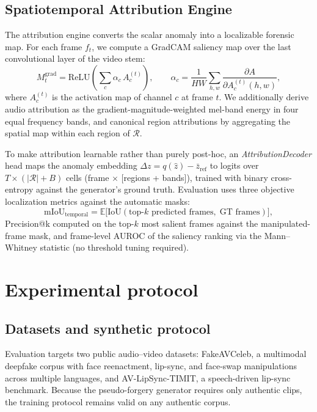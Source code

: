 \documentclass[sn-basic,Numbered,referee]{sn-jnl}
\begin{document}
\subsection{Spatiotemporal Attribution Engine}
\label{sec:sae}

The attribution engine converts the scalar anomaly into a localizable forensic map. For each frame $f_t$, we compute a GradCAM saliency map over the last convolutional layer of the video stem:
\begin{equation}
M_t^\text{grad} = \text{ReLU}\!\left(\sum_{c} \alpha_c\, A_c^{(t)}\right), \qquad
\alpha_c = \frac{1}{HW}\sum_{h,w}\frac{\partial A}{\partial A_c^{(t)}(h,w)},
\end{equation}
where $A_c^{(t)}$ is the activation map of channel $c$ at frame $t$. We additionally derive audio attribution as the gradient-magnitude-weighted mel-band energy in four equal frequency bands, and canonical region attributions by aggregating the spatial map within each region of $\mathcal{R}$.

To make attribution learnable rather than purely post-hoc, an \emph{AttributionDecoder} head maps the anomaly embedding $\Delta z = q(\hat{z}) - \bar{z}_\text{ref}$ to logits over $T \times (|\mathcal{R}| + B)$ cells (frame $\times$ [regions + bands]), trained with binary cross-entropy against the generator's ground truth. Evaluation uses three objective localization metrics against the automatic masks:
\begin{equation}
\text{mIoU}_\text{temporal} = \mathbb{E}\big[\text{IoU}(\text{top-}k \text{ predicted frames},\; \text{GT frames})\big],
\end{equation}
Precision@k computed on the top-$k$ most salient frames against the manipulated-frame mask, and frame-level AUROC of the saliency ranking via the Mann--Whitney statistic (no threshold tuning required).

\section{Experimental protocol}
\label{sec:experiments}

\subsection{Datasets and synthetic protocol}
\label{sec:datasets}

Evaluation targets two public audio--video datasets: FakeAVCeleb, a multimodal deepfake corpus with face reenactment, lip-sync, and face-swap manipulations across multiple languages, and AV-LipSync-TIMIT, a speech-driven lip-sync benchmark. Because the pseudo-forgery generator requires only authentic clips, the training protocol remains valid on any authentic corpus.
\end{document}
